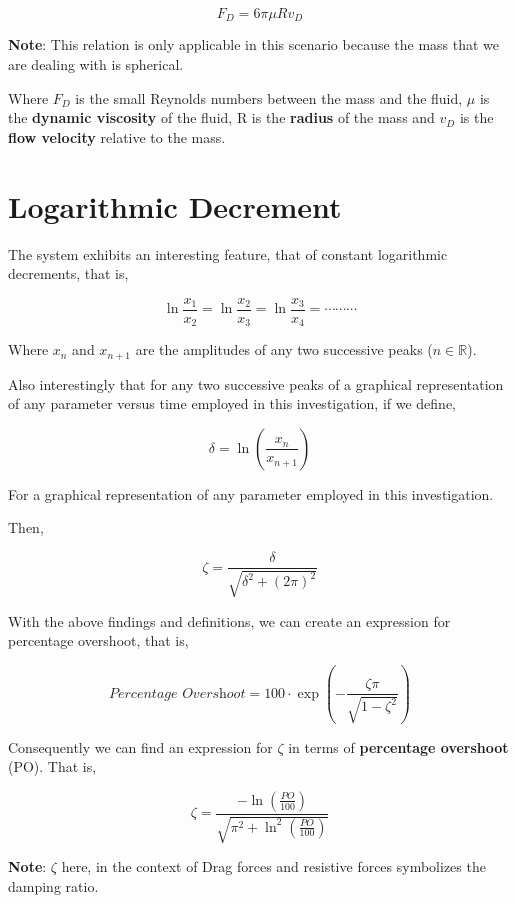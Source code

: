         $$F_D = 6\pi\mu Rv_D$$
            
    {\textbf{Note}: This relation is only applicable in this scenario because the mass that we are dealing with is spherical.}
            
    {Where $F_D$ is the small Reynolds numbers between the mass and the fluid, $\mu$ is the \textbf{dynamic viscosity} of the fluid, R is the \textbf{radius} of the mass and $v_D$ is the \textbf{flow velocity} relative to the mass.}
            
\section{{Logarithmic Decrement}}
            
    {The system exhibits an interesting feature, that of constant logarithmic decrements, that is,}
            
        $$\ln{\frac{x_1}{x_2}} = \ln{\frac{x_2}{x_3}} = \ln{\frac{x_3}{x_4}} = \cdots\cdots\cdots$$
            
    {Where $x_n$ and $x_{n + 1}$ are the amplitudes of any two successive peaks ($n \in \mathbb{R}$).}
            
    {Also interestingly that for any two successive peaks of a graphical representation of any parameter versus time employed in this investigation, if we define,}
            
        $$\delta = \ln{\left(\frac{x_n}{x_{n + 1}}\right)}$$
            
    {For a graphical representation of any parameter employed in this investigation.}
            
    {Then,}
            
        $$\zeta = \frac{\delta}{\sqrt{\delta^2 + \left(2\pi\right)^2}}$$
            
    {With the above findings and definitions, we can create an expression for percentage overshoot, that is,}
            
        $$\textit{Percentage Overshoot} = 100\cdot\exp{\left(-\frac{\zeta\pi}{\sqrt{1 - \zeta^2}}\right)}$$
            
    {Consequently we can find an expression for $\zeta$ in terms of \textbf{percentage overshoot} (PO). That is,}
            
        $$\zeta = \frac{-\ln{\left(\frac{PO}{100}\right)}}{\sqrt{\pi^2 + \ln^2{\left(\frac{PO}{100}\right)}}}$$
            
    {\textbf{Note}: $\zeta$ here, in the context of Drag forces and resistive forces symbolizes the damping ratio.}
            
